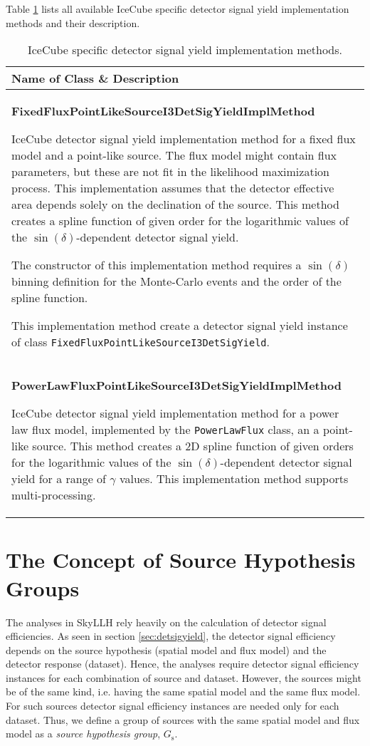 \documentclass{article}
\newcommand{\code}[1]{\texttt{#1}}
\newcommand{\class}[1]{\colorbox{blue!30}{\code{#1}}}
\begin{document}
Table \ref{tbl:I3DetSigYieldImplMethod} lists all available IceCube specific
detector signal yield implementation methods and their description.
\begin{table}
\caption{IceCube specific detector signal yield implementation methods.}
\label{tbl:I3DetSigYieldImplMethod}

\begin{tabular}{p{}}
\hline
Name of Class \& Description \\
\hline
\textbf{FixedFluxPointLikeSourceI3DetSigYieldImplMethod}

IceCube detector signal yield
    implementation method for a fixed flux model and a point-like source.
    The flux model might contain flux parameters, but these are not fit in the
    likelihood maximization process.
    This implementation assumes that the detector effective area depends solely
    on the declination of the source. This method creates
    a spline function of given order for the logarithmic values of the
    $\sin(\delta)$-dependent detector signal yield.

    The constructor of this implementation method requires a $\sin(\delta)$
    binning definition for the Monte-Carlo events and the order of the spline
    function.

    This implementation method create a detector signal yield instance of class
    \class{FixedFluxPointLikeSourceI3DetSigYield}.
\\
\hline
\textbf{PowerLawFluxPointLikeSourceI3DetSigYieldImplMethod}

IceCube detector signal
    yield implementation method for a
    power law flux model, implemented by the \class{PowerLawFlux} class, an a
    point-like source.
    This method creates a 2D spline function of given orders for the logarithmic
    values of the $\sin(\delta)$-dependent detector signal yield for a
    range of $\gamma$ values. This implementation method supports
    multi-processing.
\end{tabular}
\end{table}

\section{The Concept of Source Hypothesis Groups}

The analyses in SkyLLH rely heavily on the calculation of detector signal
efficiencies. As seen in section \ref{sec:detsigyield}, the detector signal
efficiency depends on the source hypothesis (spatial model and flux model)
and the detector response (dataset). Hence, the analyses require detector signal
efficiency instances for each combination of source and dataset.
However, the sources might be of the same kind, i.e. having the same spatial
model and the same flux model. For such sources detector signal efficiency
instances are needed only for each dataset. Thus, we define a group
of sources with the same spatial model and flux model as a \emph{source hypothesis group},
$G_{\mathrm{s}}$.
\end{document}
